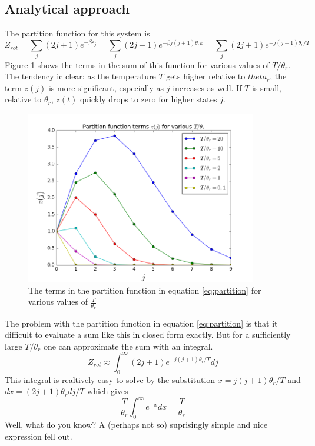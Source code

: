 \documentclass[10pt,a4paper]{amsart}
\begin{document}
\subsection{Analytical approach}

The partition function for this system is
\begin{equation}
\label{eq:partition}
Z_{rot} = \sum_j (2j + 1)e^{-\beta\varepsilon_j} 
        = \sum_j (2j + 1)e^{-\beta j(j+1)\theta_r k}
        = \sum_j (2j + 1)e^{-j(j+1)\theta_r/T}
\end{equation}
Figure \ref{fig:partitionterms} shows the terms in the sum of this function for various values of $T/\theta_r$. The tendency ic clear: as the temperature $T$ gets higher relative to $theta_r$, the term $z(j)$ is more significant, especially as $j$ increases as well. If $T$ is small, relative to $\theta_r$, $z(t)$ quickly drops to zero for higher states $j$. 

\begin{figure}
	\centering
	\includegraphics[width=0.9\textwidth]{figures/partitionterms.png}
	\caption{The terms in the partition function in equation \ref{eq:partition} for various values of $\frac{T}{\theta_r}$}
	\label{fig:partitionterms}
\end{figure}

The problem with the partition function in equation \ref{eq:partition} is that it difficult to evaluate a sum like this in closed form exactly. But for a sufficiently large $T/\theta_r$ one can approximate the sum with an integral.
\begin{equation}
Z_{rot} \approx \int_0^{\infty} (2j+1)e^{-j(j+1)\theta_r/T}dj
\end{equation}
This integral is realtively easy to solve by the substitution $x=j(j+1)\theta_r/T$ and $dx = (2j+1)\theta_r dj/T$ which gives
\begin{equation}
\frac{T}{\theta_r}\int_0^{\infty}e^{-x}dx=\frac{T}{\theta_r}
\end{equation}
Well, what do you know? A (perhaps not so) suprisingly simple and nice expression fell out.
\end{document}
